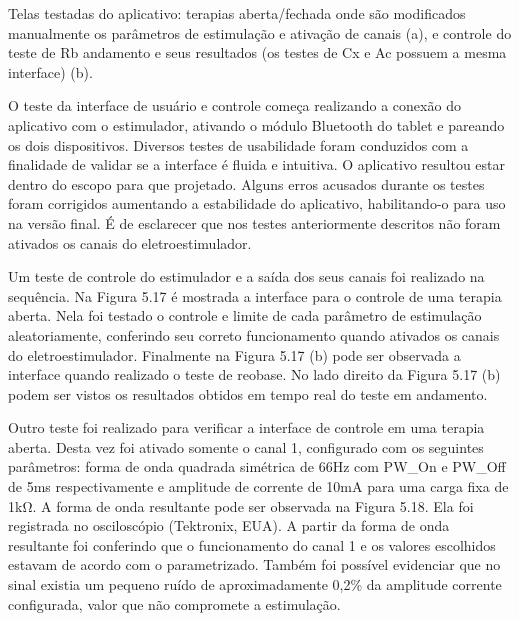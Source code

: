        
         
          Telas  testadas  do  aplicativo:  terapias  aberta/fechada  onde  são  modificados  manualmente  os  parâmetros  de  estimulação  e  ativação  de  canais  (a),  e  controle  do  teste  de  Rb  andamento  e  seus  resultados  (os  testes  de  Cx  e  Ac  possuem  a  mesma  interface)  (b). 
          
          O  teste  da  interface  de  usuário  e  controle  começa  realizando  a  conexão  do  aplicativo  com  o  estimulador,  ativando  o  módulo  Bluetooth  do  tablet  e  pareando  os  dois  dispositivos.  Diversos  testes  de  usabilidade  foram  conduzidos  com  a  finalidade  de  validar  se  a  interface  é  fluida  e  intuitiva.  O  aplicativo  resultou  estar  dentro  do  escopo  para  que  projetado.  Alguns  erros  acusados  durante  os  testes  foram  corrigidos  aumentando  a  estabilidade  do  aplicativo,  habilitando-o  para  uso  na  versão  final.  É  de  esclarecer  que  nos  testes  anteriormente  descritos  não  foram  ativados  os  canais  do  eletroestimulador. 
          
          Um  teste  de  controle  do  estimulador  e  a  saída  dos  seus  canais  foi  realizado  na  sequência.  Na  Figura  5.17  é  mostrada  a  interface  para  o  controle  de  uma  terapia  aberta.  Nela  foi  testado  o  controle  e  limite  de  cada  parâmetro  de  estimulação  aleatoriamente,  conferindo  seu  correto  funcionamento  quando  ativados  os  canais  do  eletroestimulador.  Finalmente  na  Figura  5.17  (b)  pode  ser  observada  a  interface  quando  realizado  o  teste  de  reobase.  No  lado  direito  da  Figura  5.17  (b)  podem  ser  vistos  os  resultados  obtidos  em  tempo  real  do  teste  em  andamento.  
          
          Outro  teste  foi  realizado  para  verificar  a  interface  de  controle  em  uma  terapia  aberta.  Desta  vez  foi  ativado  somente  o  canal  1,  configurado  com  os  seguintes  parâmetros:  forma  de  onda  quadrada  simétrica  de  66Hz  com  PW\_{On}  e  PW\_{Off}  de  5ms  respectivamente  e  amplitude  de  corrente  de  10mA  para  uma  carga  fixa  de  1k$\mathrm{\Omega}$.  A  forma  de  onda  resultante  pode  ser  observada  na  Figura  5.18.  Ela  foi  registrada  no  osciloscópio  (Tektronix,  EUA).  A  partir  da  forma  de  onda  resultante  foi  conferindo  que  o  funcionamento  do  canal  1  e  os  valores  escolhidos  estavam  de  acordo  com  o  parametrizado.   Também  foi  possível  evidenciar  que  no  sinal  existia  um  pequeno  ruído  de  aproximadamente  0,2\% da  amplitude  corrente  configurada,  valor  que  não  compromete  a  estimulação.
         
